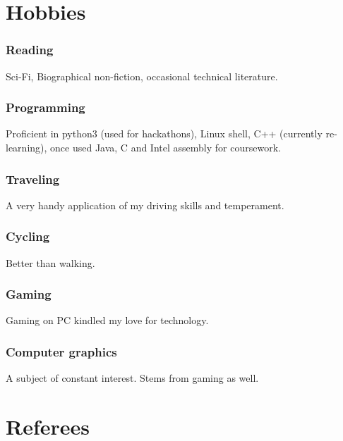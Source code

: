 \documentclass[a4paper]{article}
\begin{document}
\section{Hobbies}
\subsubsection{Reading}
Sci-Fi, Biographical non-fiction, occasional technical literature.
\subsubsection{Programming}
Proficient in python3 (used for hackathons), Linux shell, C++ (currently re-learning), once used Java, C and Intel assembly for coursework.
\subsubsection{Traveling}
A very handy application of my driving skills and temperament.
\subsubsection{Cycling}
Better than walking.
\subsubsection{Gaming}
Gaming on PC kindled my love for technology.
\subsubsection{Computer graphics}
A subject of constant interest. Stems from gaming as well.

\section{Referees}
\end{document}
